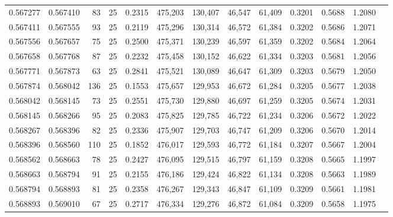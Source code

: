 \begin{tabular}{rrrrrrrrrrrrr}
0.567277 & 0.567410 &    83 &  25 &                                     0.2315 & 475,203 & 130,407 &  46,547 &  61,409 & 0.3201 & 0.5688 & 1.2080 \\
0.567411 & 0.567555 &    93 &  25 &                                     0.2119 & 475,296 & 130,314 &  46,572 &  61,384 & 0.3202 & 0.5686 & 1.2071 \\
0.567556 & 0.567657 &    75 &  25 &                                     0.2500 & 475,371 & 130,239 &  46,597 &  61,359 & 0.3202 & 0.5684 & 1.2064 \\
0.567658 & 0.567768 &    87 &  25 &                                     0.2232 & 475,458 & 130,152 &  46,622 &  61,334 & 0.3203 & 0.5681 & 1.2056 \\
0.567771 & 0.567873 &    63 &  25 &                                     0.2841 & 475,521 & 130,089 &  46,647 &  61,309 & 0.3203 & 0.5679 & 1.2050 \\
0.567874 & 0.568042 &   136 &  25 &                                     0.1553 & 475,657 & 129,953 &  46,672 &  61,284 & 0.3205 & 0.5677 & 1.2038 \\
0.568042 & 0.568145 &    73 &  25 &                                     0.2551 & 475,730 & 129,880 &  46,697 &  61,259 & 0.3205 & 0.5674 & 1.2031 \\
0.568145 & 0.568266 &    95 &  25 &                                     0.2083 & 475,825 & 129,785 &  46,722 &  61,234 & 0.3206 & 0.5672 & 1.2022 \\
0.568267 & 0.568396 &    82 &  25 &                                     0.2336 & 475,907 & 129,703 &  46,747 &  61,209 & 0.3206 & 0.5670 & 1.2014 \\
0.568396 & 0.568560 &   110 &  25 &                                     0.1852 & 476,017 & 129,593 &  46,772 &  61,184 & 0.3207 & 0.5667 & 1.2004 \\
0.568562 & 0.568663 &    78 &  25 &                                     0.2427 & 476,095 & 129,515 &  46,797 &  61,159 & 0.3208 & 0.5665 & 1.1997 \\
0.568663 & 0.568794 &    91 &  25 &                                     0.2155 & 476,186 & 129,424 &  46,822 &  61,134 & 0.3208 & 0.5663 & 1.1989 \\
0.568794 & 0.568893 &    81 &  25 &                                     0.2358 & 476,267 & 129,343 &  46,847 &  61,109 & 0.3209 & 0.5661 & 1.1981 \\
0.568893 & 0.569010 &    67 &  25 &                                     0.2717 & 476,334 & 129,276 &  46,872 &  61,084 & 0.3209 & 0.5658 & 1.1975 \\

\end{tabular}
